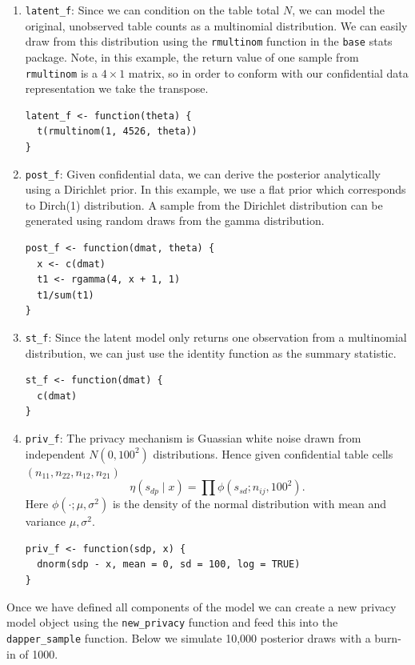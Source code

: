 \begin{enumerate}
\def\labelenumi{\arabic{enumi}.}
\item
  \texttt{latent\_f}: Since we can condition on the table total \(N\), we can model the original, unobserved table counts as a multinomial
  distribution. We can easily draw from this distribution using the
  \texttt{rmultinom} function in the \texttt{base} stats package. Note, in this example,
  the return value of one sample from \texttt{rmultinom} is a \(4 \times 1\) matrix, so
  in order to conform with our confidential data representation we take the transpose.

\begin{verbatim}
latent_f <- function(theta) {
  t(rmultinom(1, 4526, theta))
}
\end{verbatim}
\item
  \texttt{post\_f}: Given confidential data, we can derive the posterior analytically
  using a Dirichlet prior. In this example, we use a flat prior which
  corresponds to Dirch(1) distribution. A sample from the Dirichlet distribution
  can be generated using random draws from the gamma distribution.

\begin{verbatim}
post_f <- function(dmat, theta) {
  x <- c(dmat)
  t1 <- rgamma(4, x + 1, 1)
  t1/sum(t1)
}
\end{verbatim}
\item
  \texttt{st\_f}: Since the latent model only returns one observation from a multinomial
  distribution, we can just use the identity function as the summary statistic.

\begin{verbatim}
st_f <- function(dmat) {
  c(dmat)
}
\end{verbatim}
\item
  \texttt{priv\_f}: The privacy mechanism is Guassian white noise drawn from independent \(N(0,100^2)\) distributions. Hence given
  confidential table cells \((n_{11}, n_{22}, n_{12}, n_{21})\)
  \[
  \eta(s_{dp} \mid x) = \prod \phi(s_{sd}; n_{ij}, 100^2).
  \]
  Here \(\phi(\cdot;\mu,\sigma^2)\) is the density of the normal distribution
  with mean and variance \(\mu,\sigma^2\).

\begin{verbatim}
priv_f <- function(sdp, x) {
  dnorm(sdp - x, mean = 0, sd = 100, log = TRUE)
}
\end{verbatim}
\end{enumerate}

Once we have defined all components of the model we can
create a new privacy model object using the \texttt{new\_privacy} function and
feed this into the \texttt{dapper\_sample} function. Below we simulate 10,000 posterior
draws with a burn-in of 1000.

